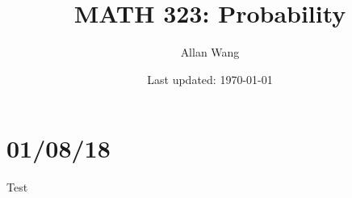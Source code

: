 \documentclass[12 pt]{article}
\author{Allan Wang}
\date{Last updated: \today}
\title{MATH 323: Probability}
\begin{document}
		\onehalfspacing
		\maketitle
		\tableofcontents
			\section{01/08/18}
			Test
	
\end{document}
